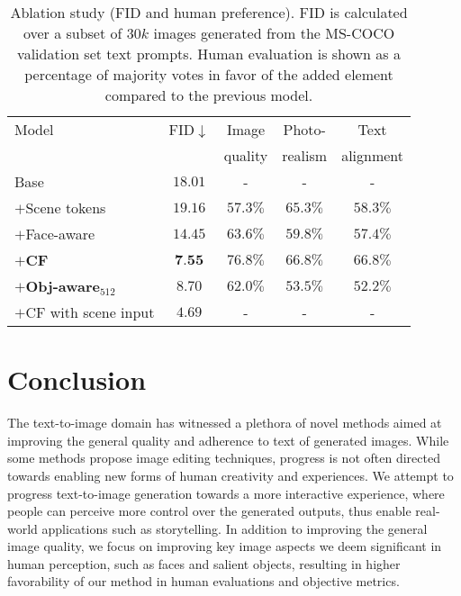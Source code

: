 \documentclass[final]{cvpr}
\begin{document}
\setlength{\tabcolsep}{4pt}
\begin{table}
\begin{center}
\label{table:abl_study}
\begin{tabular}{lc|ccc}
\hline\noalign{\smallskip}
Model & FID$\downarrow$ & Image & Photo- & Text \\
& & quality & realism & alignment  \\
\noalign{\smallskip}
\hline
\noalign{\smallskip}
Base & $18.01$ & - & - & - \\
$+$Scene tokens & $19.16$ & $57.3\%$  & $65.3\%$ & $58.3\%$ \\
$+$Face-aware & $14.45$ & $63.6\%$  & $59.8\%$ & $57.4\%$ \\
$+$\textbf{CF} & $\textbf{7.55}$ & $76.8\%$  & $66.8\%$ & $66.8\%$ \\
$+$\textbf{Obj-aware}$_{512}$ & $8.70$ & $62.0\%$  & $53.5\%$ & $52.2\%$ \\ 
\hline
$+$CF with scene input & $4.69$ & - & - & - \\
\hline
\end{tabular}
\vspace{0.2cm}
\caption{Ablation study (FID and human preference). FID is calculated over a subset of $30k$ images generated from the MS-COCO validation set text prompts. Human evaluation is shown as a percentage of majority votes in favor of the added element compared to the previous model.}

\end{center}
\end{table}
\setlength{\tabcolsep}{1.4pt}

\section{Conclusion}
The text-to-image domain has witnessed a plethora of novel methods aimed at improving the general quality and adherence to text of generated images. While some methods propose image editing techniques, progress is not often directed towards enabling new forms of human creativity and experiences. We attempt to progress text-to-image generation towards a more interactive experience, where people can perceive more control over the generated outputs, thus enable real-world applications such as storytelling. In addition to improving the general image quality, we focus on improving key image aspects we deem significant in human perception, such as faces and salient objects, resulting in higher favorability of our method in human evaluations and objective metrics.
\end{document}

